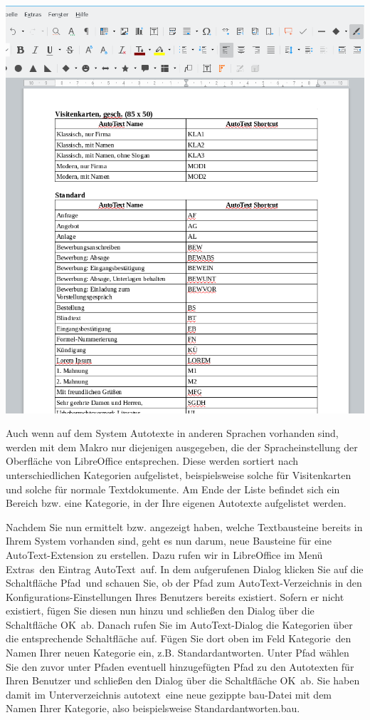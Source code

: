 \documentclass[a4paper,10pt,pagesize,titlepage]{scrbook}
\begin{document}
\begin{center}
	\includegraphics[width=0.9\linewidth]{pics/available_autotext}
	\label{fig:available_autotext}
\end{center}

Auch wenn auf dem System Autotexte in anderen Sprachen vorhanden sind, werden mit dem Makro nur diejenigen ausgegeben, die der Spracheinstellung der Oberfläche von LibreOffice entsprechen. Diese werden sortiert nach unterschiedlichen Kategorien aufgelistet, beispielsweise solche für Visitenkarten und solche für normale Textdokumente. Am Ende der Liste befindet sich ein Bereich bzw. eine Kategorie, in der Ihre eigenen Autotexte aufgelistet werden.

Nachdem Sie nun ermittelt bzw. angezeigt haben, welche Textbausteine bereits in Ihrem System vorhanden sind, geht es nun darum, neue Bausteine für eine AutoText-Extension zu erstellen. Dazu rufen wir in LibreOffice im Menü \glqq Extras\grqq~den Eintrag \glqq AutoText\grqq~auf. In dem aufgerufenen Dialog klicken Sie auf die Schaltfläche \glqq Pfad\grqq~und schauen Sie, ob der Pfad zum AutoText-Verzeichnis in den Konfigurations-Einstellungen Ihres Benutzers bereits existiert. Sofern er nicht existiert, fügen Sie diesen nun hinzu und schließen den Dialog über die Schaltfläche \glqq OK\grqq~ab. Danach rufen Sie im AutoText-Dialog die Kategorien über die entsprechende Schaltfläche auf. Fügen Sie dort oben im Feld \glqq Kategorie\grqq~den Namen Ihrer neuen Kategorie ein, z.B. \glqq Standardantworten\grqq. Unter Pfad wählen Sie den zuvor unter Pfaden eventuell hinzugefügten Pfad zu den Autotexten für Ihren Benutzer und schließen den Dialog über die Schaltfläche \glqq OK\grqq~ab. Sie haben damit im Unterverzeichnis \glqq autotext\grqq~eine neue gezippte bau-Datei mit dem Namen Ihrer Kategorie, also beispielsweise \glqq Standardantworten.bau\grqq.
\end{document}
